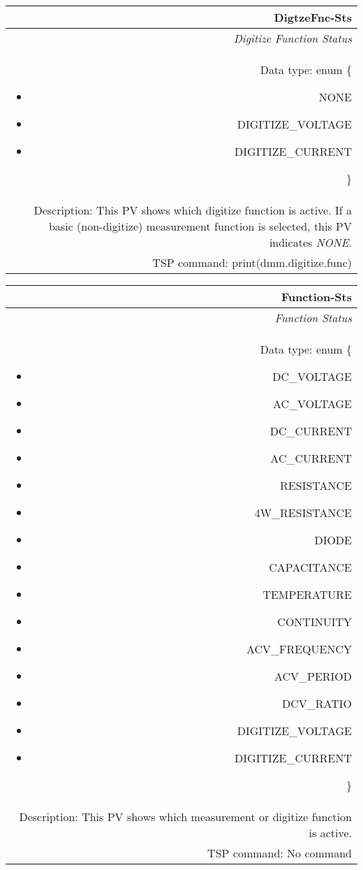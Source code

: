 \documentclass[openany]{article}
\begin{document}
		\begin{tabular}{N}
			\hline
			\bfseries DigtzeFnc-Sts\label{pv:digtzefnc-sts} \\ \hline
			\emph{Digitize Function Status} \\
			Data type: enum \{\begin{itemize}[noitemsep]
				\small
				\item[] NONE
				\item[] DIGITIZE\_VOLTAGE
				\item[] DIGITIZE\_CURRENT
			\end{itemize}\} \\
			Description: This PV shows which digitize function is active. If a basic (non-digitize) measurement function is selected, this PV indicates \emph{NONE}. \\
			TSP command: print(dmm.digitize.func)
		\end{tabular}

		\begin{tabular}{N}
			\hline
			\bfseries Function-Sts\label{pv:function-sts} \\ \hline
			\emph{Function Status} \\
			Data type: enum \{\begin{itemize}[noitemsep]
				\item[] DC\_VOLTAGE
				\item[] AC\_VOLTAGE
				\item[] DC\_CURRENT
				\item[] AC\_CURRENT
				\item[] RESISTANCE
				\item[] 4W\_RESISTANCE
				\item[] DIODE
				\item[] CAPACITANCE
				\item[] TEMPERATURE
				\item[] CONTINUITY
				\item[] ACV\_FREQUENCY
				\item[] ACV\_PERIOD
				\item[] DCV\_RATIO
				\item[] DIGITIZE\_VOLTAGE
				\item[] DIGITIZE\_CURRENT
			\end{itemize}\} \\
			Description: This PV shows which measurement or digitize function is active. \\
			TSP command: No command
		\end{tabular}
\end{document}
